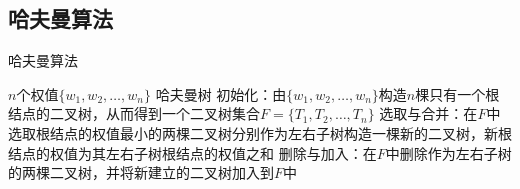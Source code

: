 \documentclass[12pt,a4paper]{amsart}
\begin{document}
\subsection{哈夫曼算法}

\begin{algorithm}[H]
\caption{哈夫曼算法}
\begin{algorithmic}[1]
\REQUIRE $n$个权值$\{w_1, w_2, \ldots, w_n\}$
\ENSURE 哈夫曼树
\STATE 初始化：由$\{w_1, w_2, \ldots, w_n\}$构造$n$棵只有一个根结点的二叉树，从而得到一个二叉树集合$F = \{T_1, T_2, \ldots, T_n\}$
    \STATE 选取与合并：在$F$中选取根结点的权值最小的两棵二叉树分别作为左右子树构造一棵新的二叉树，新根结点的权值为其左右子树根结点的权值之和
    \STATE 删除与加入：在$F$中删除作为左右子树的两棵二叉树，并将新建立的二叉树加入到$F$中
\ENDWHILE
\end{algorithmic}
\end{algorithm}
\end{document}
